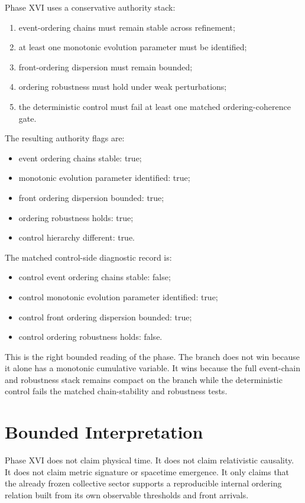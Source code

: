 \documentclass[11pt]{article}
\begin{document}
Phase XVI uses a conservative authority stack:
\begin{enumerate}
\item event-ordering chains must remain stable across refinement;
\item at least one monotonic evolution parameter must be identified;
\item front-ordering dispersion must remain bounded;
\item ordering robustness must hold under weak perturbations;
\item the deterministic control must fail at least one matched ordering-coherence gate.
\end{enumerate}

The resulting authority flags are:
\begin{itemize}
\item event ordering chains stable: true;
\item monotonic evolution parameter identified: true;
\item front ordering dispersion bounded: true;
\item ordering robustness holds: true;
\item control hierarchy different: true.
\end{itemize}

The matched control-side diagnostic record is:
\begin{itemize}
\item control event ordering chains stable: false;
\item control monotonic evolution parameter identified: true;
\item control front ordering dispersion bounded: true;
\item control ordering robustness holds: false.
\end{itemize}

This is the right bounded reading of the phase. The branch does not win because it alone has a monotonic cumulative variable. It wins because the full event-chain and robustness stack remains compact on the branch while the deterministic control fails the matched chain-stability and robustness tests.

\section{Bounded Interpretation}

Phase XVI does not claim physical time. It does not claim relativistic causality. It does not claim metric signature or spacetime emergence. It only claims that the already frozen collective sector supports a reproducible internal ordering relation built from its own observable thresholds and front arrivals.
\end{document}
